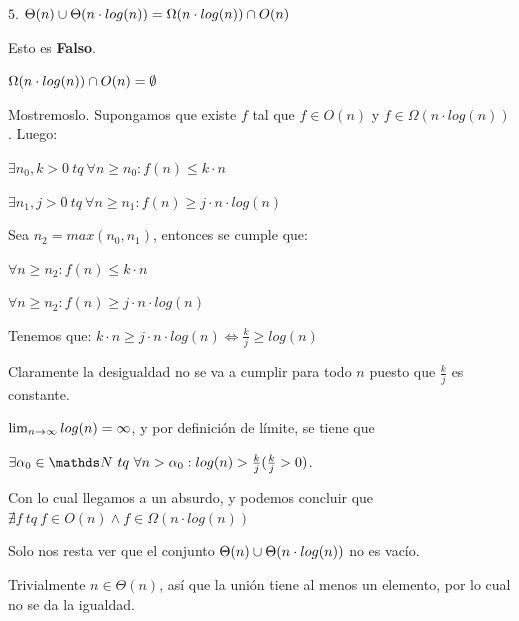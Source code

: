 \documentclass[10pt,a4paper]{article}
\begin{document}
\demoline
\demoline
\par $5.$ \ensuremath{\Theta(n) \union \Theta(n \cdot log(n))= \Omega(n \cdot log(n)) \interseccion O(n)} 
\demoline
\begin{groupIzq}{2.5em}
  \par Esto es \textbf{Falso}.
  \par \ensuremath{\Omega(n \cdot log(n)) \interseccion O(n) = \emptyset}
  \par Mostremoslo. Supongamos que existe \ensuremath{f} tal que \ensuremath{f \in O(n)} y \ensuremath{f \in \Omega(n \cdot log(n))}. Luego:
  \begin{groupIzq}{1em}
    \par \ensuremath{\exists n_0, k > 0\ tq\ \forall n \geq n_0 : f(n) \leq k \cdot n}
    \par \ensuremath{\exists n_1, j > 0\ tq\ \forall n \geq n_1 : f(n) \geq j \cdot n \cdot log(n)}
    \par Sea \ensuremath{n_2=max(n_0, n_1)}, entonces se cumple que:
    \par \ensuremath{\forall n \geq n_2 : f(n) \leq k \cdot n}
    \par \ensuremath{\forall n \geq n_2 : f(n) \geq j \cdot n \cdot log(n)}
    \par Tenemos que: \ensuremath{k \cdot n \geq j \cdot n \cdot log(n) \Leftrightarrow \frac{k}{j} \geq log(n)}
    \par Claramente la desigualdad no se va a cumplir para todo \ensuremath{n} puesto que \ensuremath{\frac{k}{j}} es constante.
    \par \ensuremath{\limn log(n) = \infty}, y por definición de límite, se tiene que
    \par \ensuremath{\exists \alpha_0 \in \nat \ tq\ \forall n > \alpha_0 : log(n) > \frac{k}{j} (\frac{k}{j} > 0)}.
  \end{groupIzq}
  \par Con lo cual llegamos a un absurdo, y podemos concluir que \ensuremath{\nexists f\ tq\ f \in O(n) \land f \in \Omega(n \cdot log(n))} 
  \par Solo nos resta ver que el conjunto \ensuremath{\Theta(n) \union \Theta(n \cdot log(n))} no es vacío.
  \par Trivialmente \ensuremath{n \in \Theta(n)}, así que la unión tiene al menos un elemento, por lo cual no se da la igualdad.
\end{groupIzq}





\end{document}
